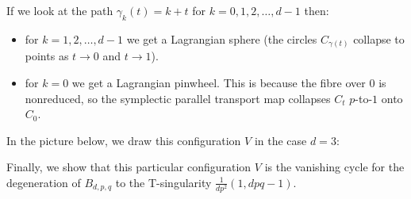 \documentclass{article}
\begin{document}
\begin{Example}
If we look at the path \(\gamma_k(t)=k+t\) for
\(k=0,1,2,\ldots,d-1\) then:
\begin{itemize}
\item for \(k=1,2,\ldots,d-1\) we get a Lagrangian sphere (the circles
\(C_{\gamma(t)}\) collapse to points as \(t\to 0\) and \(t\to
1\)).
\item for \(k=0\) we get a Lagrangian pinwheel. This is because the
fibre over \(0\) is nonreduced, so the symplectic parallel
transport map collapses \(C_t\) \(p\)-to-\(1\) onto \(C_0\).


\end{itemize}
\end{Example}
In the picture below, we draw this configuration \(V\) in the case
\(d=3\):


\begin{center}
\end{center}
Finally, we show that this particular configuration \(V\) is the
vanishing cycle for the degeneration of \(B_{d,p,q}\) to the
T-singularity \(\frac{1}{dp^2}(1,dpq-1)\).
\end{document}
